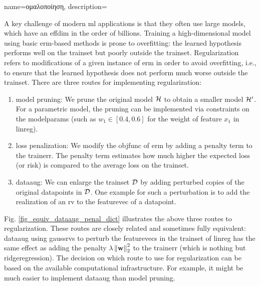 {name={\foreignlanguage{greek}{ομαλοποίηση}}, 
	description={A key challenge of modern \gls{ml} applications is that they often 
		use large \gls{model}s, which have an \gls{effdim} in the order of billions. 
		Training a high-dimensional \gls{model} using basic \gls{erm}-based methods
		is prone to \gls{overfitting}: the learned \gls{hypothesis} performs well on the \gls{trainset} 
		but poorly outside the \gls{trainset}. Regularization refers to modifications of a given instance 
		of \gls{erm} in order to avoid \gls{overfitting}, i.e., to ensure that the learned \gls{hypothesis} does 
		not perform much worse outside the \gls{trainset}. There are three routes for implementing 
		regularization: 
		\begin{enumerate}[label=\arabic*)]
			\item {\Gls{model} pruning:} We prune the original \gls{model} $\mathcal{H}$ to obtain a 
			smaller \gls{model} $\mathcal{H}'$. For a parametric \gls{model}, the pruning can be 
			implemented via constraints on the \gls{modelparams} (such as $w_{1} \in [0.4,0.6]$ for 
			the weight of \gls{feature} $x_{1}$ in \gls{linreg}).
			\item {\Gls{loss} penalization:} We modify the \gls{objfunc} of \gls{erm} by adding a 
			penalty term to the \gls{trainerr}. The penalty term estimates how much higher the expected \gls{loss} (or \gls{risk}) 
			is compared to the average \gls{loss} on the \gls{trainset}. 
			\item {\Gls{dataaug}:} We can enlarge the \gls{trainset} $\mathcal{D}$ by adding 
			perturbed copies of the original \gls{datapoint}s in $\mathcal{D}$. One example for such 
			a perturbation is to add the \gls{realization} of an \gls{rv} to the \gls{featurevec} 
			of a \gls{datapoint}. 
		\end{enumerate} 
		Fig. \ref{fig_equiv_dataaug_penal_dict} illustrates the above three routes to regularization. 
		These routes are closely related and sometimes fully equivalent: \gls{dataaug} using \gls{gaussrv}s 
		to perturb the \gls{featurevec}s in the \gls{trainset} of \gls{linreg} 
		has the same effect as adding the penalty 
		$\lambda \left\Vert {{\bf w}} \right\Vert_{2}^2$ to the \gls{trainerr} (which is nothing but \gls{ridgeregression}). 
        		The decision on which route to use for regularization can be based on the 
        		available computational infrastructure. For example, it might be much easier to 
       	 	implement \gls{dataaug} than \gls{model} pruning. 
}}
